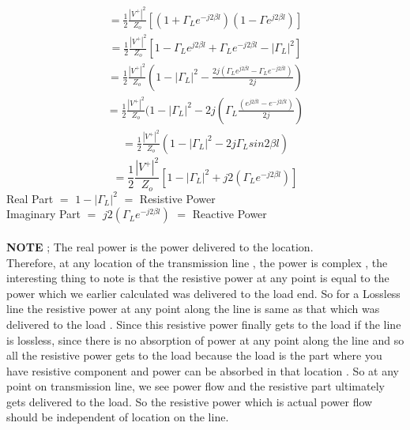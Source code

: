\begin{align*}
=\frac{1}{2} \frac{{| V ^+ |}^2}{Z_o} [( 1 + \Gamma_L e^{-j2\beta l})(1 - \Gamma e^{j2\beta l})]
\end{align*}
\begin{align*}
= \frac{1}{2} \frac{{ | V^+ | }^2}{Z_o} [ 1 - \Gamma_L e^{j2\beta l} + \Gamma_L e^ {-j2\beta l} - {| \Gamma_L | ^2}]
\end{align*}
\begin{align*} 
=\frac{1}{2} \frac{{ | V^+ | }^2}{Z_o} ( 1 - {|\Gamma_L}|^2 -\frac{2j(\Gamma_L e^{j2\beta l} - \Gamma_L e^{-j2\beta l})}{2j} )
\end{align*}
\begin{align*} 
=\frac{1}{2} \frac{{ | V^+ | }^2}{Z_o} ( 1 - {|\Gamma_L}|^2 -2j(\Gamma_L \frac{ ( e^{j2\beta l} - e^{-j2\beta l})}{2j}) 
\end{align*}
\begin{align*} 
=\frac{1}{2} \frac{{ | V^+ | }^2}{Z_o} ( 1 - {|\Gamma_L}|^2 -2j\Gamma_L sin2\beta l ) 
\end{align*}
\begin{equation} 
=\frac{1}{2} \frac{{ | V^+ | }^2}{Z_o}  [1 - {|\Gamma_L}|^2 + j2(\Gamma_Le^{-j2\beta l})]
\end{equation}
Real Part $=$ $1 - {|\Gamma_L}|^2$ $=$ Resistive Power\\
Imaginary Part $=$ $ j2(\Gamma_Le^{-j2\beta l})$ $=$ Reactive Power\\\\
\textbf{NOTE} ; The real power is the power delivered to the location.\\   
Therefore, at any location of the transmission line , the power is complex , the interesting thing to note is that the resistive power at any point is equal to the power which we earlier calculated was delivered to the load end. So for a Lossless line the resistive power at any point along the line is same as that which was delivered to the load . Since  this resistive power finally gets to the load if the line is lossless, since there is no absorption of power at any point along the line and so all the resistive power gets to the load because the load is the part where you have resistive component and power can be  absorbed in that location . So at any point on transmission line, we see power flow and the resistive part ultimately gets delivered to the load.  So the resistive power which is actual power flow should be independent of location on the line.

